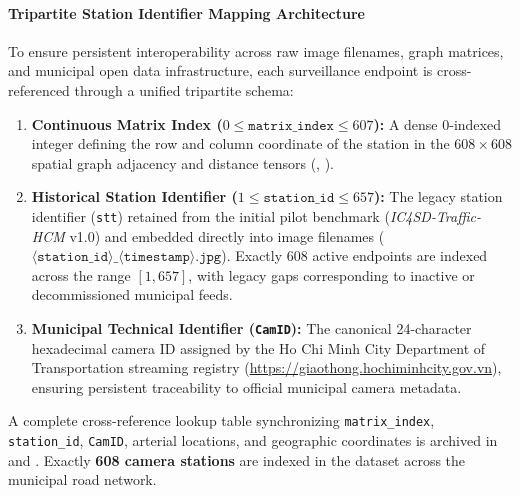 \documentclass[preprint,12pt]{elsarticle}
\begin{document}
\paragraph{Tripartite Station Identifier Mapping Architecture}
To ensure persistent interoperability across raw image filenames, graph matrices, and municipal open data infrastructure, each surveillance endpoint is cross-referenced through a unified tripartite schema:
\begin{enumerate}
    \item \textbf{Continuous Matrix Index ($0 \le \texttt{matrix\_index} \le 607$):} A dense 0-indexed integer defining the row and column coordinate of the station in the $608 \times 608$ spatial graph adjacency and distance tensors (, ).
    \item \textbf{Historical Station Identifier ($1 \le \texttt{station\_id} \le 657$):} The legacy station identifier (\texttt{stt}) retained from the initial pilot benchmark (\textit{IC4SD-Traffic-HCM} v1.0) and embedded directly into image filenames ($\langle\texttt{station\_id}\rangle\mathbin{\_}\langle\texttt{timestamp}\rangle\texttt{.jpg}$). Exactly 608 active endpoints are indexed across the range $[1, 657]$, with legacy gaps corresponding to inactive or decommissioned municipal feeds.
    \item \textbf{Municipal Technical Identifier (\texttt{CamID}):} The canonical 24-character hexadecimal camera ID assigned by the Ho Chi Minh City Department of Transportation streaming registry (\url{https://giaothong.hochiminhcity.gov.vn}), ensuring persistent traceability to official municipal camera metadata.
\end{enumerate}
A complete cross-reference lookup table synchronizing \texttt{matrix\_index}, \texttt{station\_id}, \texttt{CamID}, arterial locations, and geographic coordinates is archived in  and . Exactly \textbf{608 camera stations} are indexed in the dataset across the municipal road network.

\clearpage
\end{document}
